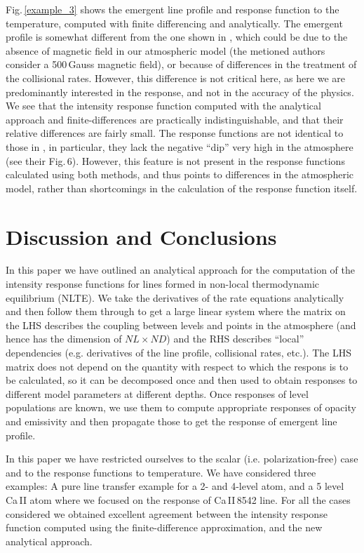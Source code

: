 \documentclass{aa}
\begin{document}
Fig.\,\ref{example_3} shows the emergent line profile and response function to the temperature, computed with finite differencing and analytically. The emergent profile is somewhat different from the one shown in \cite{Ca_diag_Jaime}, which could be due to the absence of magnetic field in our atmospheric model (the metioned authors consider a 500\,Gauss magnetic field), or because of differences in the treatment of the collisional rates. However, this difference is not critical here, as here we are predominantly interested in the response, and not in the accuracy of the physics. We see that the intensity response function computed with the analytical approach and finite-differences are practically indistinguishable, and that their relative differences are fairly small. The response functions are not identical to those in \cite{Ca_diag_Jaime}, in particular, they lack the negative ``dip'' very high in the atmosphere (see their Fig.\,6). However, this feature is not present in the response functions calculated using both methods, and thus points to differences in the atmospheric model, rather than shortcomings in the calculation of the response function itself.

\section{Discussion and Conclusions}

In this paper we have outlined an analytical approach for the computation of the intensity response functions for lines formed in non-local thermodynamic equilibrium (NLTE). We take the derivatives of the rate equations analytically and then follow them through to get a large linear system where the matrix on the LHS describes the coupling between levels and points in the atmosphere (and hence has the dimension of $NL\times ND$) and the RHS describes ``local'' dependencies (e.g. derivatives of the line profile, collisional rates, etc.). The LHS matrix does not depend on the quantity with respect to which the respons is to be calculated, so it can be decomposed once and then used to obtain responses to different model parameters at different depths. Once responses of level populations are known, we use them to compute appropriate responses of opacity and emissivity and then propagate those to get the response of emergent line profile. 

In this paper we have restricted ourselves to the scalar (i.e. polarization-free) case and to the response functions to temperature. We have considered three examples: A pure line transfer example for a 2- and 4-level atom, and a 5 level Ca\,II atom where we focused on the response of Ca\,II\,8542 line. For all the cases considered we obtained excellent agreement between the intensity response function computed using the finite-difference approximation, and the new analytical approach. 
\end{document}
